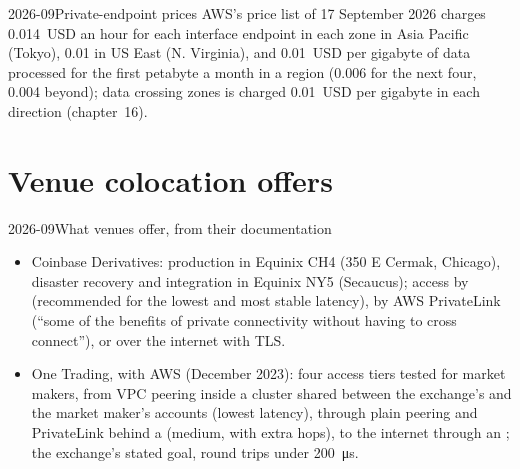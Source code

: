 \label{lst:nw:private-connectivity-to-crypto-venues:path}

\begin{dated}{2026-09}{Private-endpoint prices}\label{dat:nw:private-connectivity-to-crypto-venues:prices}
AWS's price list of 17 September 2026 charges 0.014~USD an hour for each interface endpoint in each zone in Asia Pacific (Tokyo), 0.01 in US East
(N. Virginia), and 0.01~USD per gigabyte of data processed for the first petabyte a month in a region (0.006 for the next four, 0.004 beyond); data
crossing zones is charged 0.01~USD per gigabyte in each direction (chapter~16).
\end{dated}

\section{Venue colocation offers}

\begin{dated}{2026-09}{What venues offer, from their documentation}\label{dat:nw:private-connectivity-to-crypto-venues:offers}
\begin{itemize}
\item Coinbase Derivatives: production in Equinix CH4 (350 E Cermak, Chicago), disaster recovery and integration in Equinix NY5 (Secaucus); access by
    (recommended for the lowest and most stable latency), by AWS PrivateLink (``some of the benefits of private connectivity
  without having to cross connect''), or over the internet with TLS.
\item One Trading, with AWS (December 2023): four access tiers tested for market makers, from VPC peering inside a cluster  shared
  between the exchange's and the market maker's accounts (lowest latency), through plain peering and PrivateLink behind a 
  (medium, with extra hops), to the internet through an ; the exchange's stated goal, round trips under \qty{200}{\micro\second}.
\end{itemize}
\end{dated}

